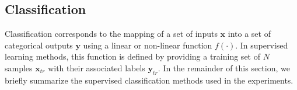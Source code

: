 \subsection{Classification}\label{subsec:cls}

Classification corresponds to the mapping of a set of inputs $\mathbf{x}$ into a set of categorical outputs $\mathbf{y}$ using a linear or non-linear function $f(\cdot)$.
In supervised learning methods, this function is defined by providing a training set of $N$ samples $\mathbf{x}_{tr}$ with their associated labels $\mathbf{y}_{tr}$.
In the remainder of this section, we briefly summarize the supervised classification methods used in the experiments.

